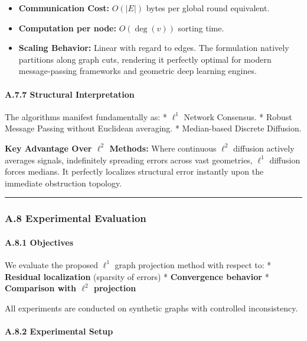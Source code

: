 \documentclass[
]{article}
\providecommand{\tightlist}{%
  \setlength{\itemsep}{0pt}\setlength{\parskip}{0pt}}
\begin{document}
\begin{itemize}
\tightlist
\item
  \textbf{Communication Cost:} \(O(|E|)\) bytes per global round
  equivalent.
\item
  \textbf{Computation per node:} \(O(\deg(v))\) sorting time.
\item
  \textbf{Scaling Behavior:} Linear with regard to edges. The
  formulation natively partitions along graph cuts, rendering it
  perfectly optimal for modern message-passing frameworks and geometric
  deep learning engines.
\end{itemize}

\paragraph{A.7.7 Structural
Interpretation}\label{a.7.7-structural-interpretation}

The algorithms manifest fundamentally as: * \(\ell^1\) Network
Consensus. * Robust Message Passing without Euclidean averaging. *
Median-based Discrete Diffusion.

\textbf{Key Advantage Over \(\ell^2\) Methods:} Where continuous
\(\ell^2\) diffusion actively averages signals, indefinitely spreading
errors across vast geometries, \(\ell^1\) diffusion forces medians. It
perfectly localizes structural error instantly upon the immediate
obstruction topology.

\begin{center}\rule{0.5\linewidth}{0.5pt}\end{center}

\subsubsection{A.8 Experimental
Evaluation}\label{a.8-experimental-evaluation}

\paragraph{A.8.1 Objectives}\label{a.8.1-objectives}

We evaluate the proposed \(\ell^1\) graph projection method with respect
to: * \textbf{Residual localization} (sparsity of errors) *
\textbf{Convergence behavior} * \textbf{Comparison with \(\ell^2\)
projection}

All experiments are conducted on synthetic graphs with controlled
inconsistency.

\paragraph{A.8.2 Experimental Setup}\label{a.8.2-experimental-setup}
\end{document}
